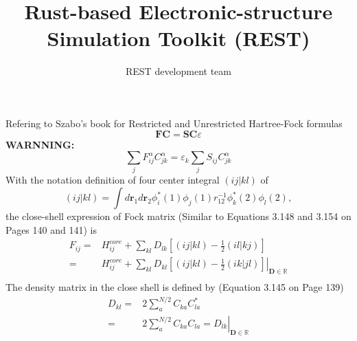 \documentclass[a4paper,12pt]{article}
\title{Rust-based Electronic-structure Simulation Toolkit (REST)}
\author{REST development team}
\begin{document}
\maketitle




\newpage
Refering to Szabo's book for Restricted and Unrestricted Hartree-Fock formulas 
\begin{equation}
	\boldsymbol{F}\boldsymbol{C}=\boldsymbol{S}\boldsymbol{C}\varepsilon
\end{equation}
\textbf{WARNNING:}
\begin{equation}
	\sum_{j}F_{ij}^{\alpha}C_{jk}^{\alpha} = \varepsilon_k\sum_{j}S_{ij}C_{jk}^{\alpha}
\end{equation}
With the notation definition of four center integral $\left( ij|kl \right)$ of
\begin{equation}
	\left( ij|kl \right) = \int d\textbf{r}_1d\textbf{r}_2 \phi_{i}^{*}(1)\phi_{j}(1)r_{12}^{-1}\phi_{k}^{*}(2)\phi_{l}(2),
\end{equation}
the close-shell expression of Fock matrix (Similar to Equations 3.148 and 3.154 on Pages 140 and 141) is 
\begin{equation}
	\begin{split}
	F_{ij}=&H_{ij}^{core}+\sum_{kl}D_{lk}\left[\left( ij|kl \right)-\frac{1}{2}\left(il|kj  \right)\right] \\
	=&\left.H_{ij}^{core}+\sum_{kl}D_{kl}\left[\left( ij|kl \right)-\frac{1}{2}\left(ik|jl  \right)\right]\right|_{\textbf{D} \in \mathbb{R}} \\
    \end{split}
\end{equation}
The density matrix in the close shell is defined by (Equation 3.145 on Page 139)
\begin{equation}
	\begin{split}
		D_{kl}=&2\sum_{a}^{N/2}C_{ka}C_{la}^{*}\\
		=&\left.2\sum_{a}^{N/2}C_{ka}C_{la}=D_{lk}\right|_{\textbf{D}\in \mathbb{R}}\\
    \end{split}
\end{equation}
\end{document}
